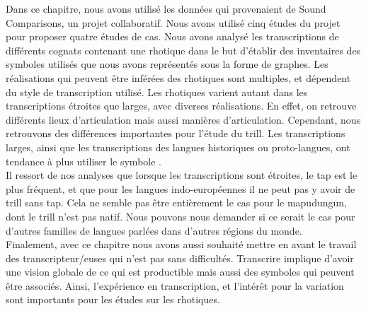 Dans ce chapitre, nous avons utilisé les données qui provenaient de Sound Comparisons, un projet collaboratif. Nous avons utilisé cinq études du projet pour proposer quatre études de cas. Nous avons analysé les transcriptions de différents cognats contenant une rhotique dans le but d'établir des inventaires des symboles utilisés que nous avons représentés sous la forme de graphes. Les réalisations qui peuvent être inférées des rhotiques sont multiples, et dépendent du style de transcription utilisé.
Les rhotiques varient autant dans les transcriptions étroites que larges, avec diverses réalisations. En effet, on retrouve différents lieux d'articulation mais aussi manières d'articulation.
Cependant, nous retrouvons des différences importantes pour l'étude du trill.
Les transcriptions larges, ainsi que les transcriptions des langues historiques ou proto-langues, ont tendance à plus utiliser le symbole .\\

Il ressort de nos analyses que lorsque les transcriptions sont étroites, le tap est le plus fréquent, et que pour les langues indo-européennes il ne peut pas y avoir de trill sans tap. Cela ne semble pas être entièrement le cas pour le mapudungun, dont le trill n'est pas natif. Nous pouvons nous demander si ce serait le cas pour d'autres familles de langues parlées dans d'autres régions du monde.\\

Finalement, avec ce chapitre nous avons aussi souhaité mettre en avant le travail des transcripteur/euses qui n'est pas sans difficultés. Transcrire implique d'avoir une vision globale de ce qui est productible mais aussi des symboles qui peuvent être associés. Ainsi, l'expérience en transcription, et l'intérêt pour la variation sont importants pour les études sur les rhotiques.